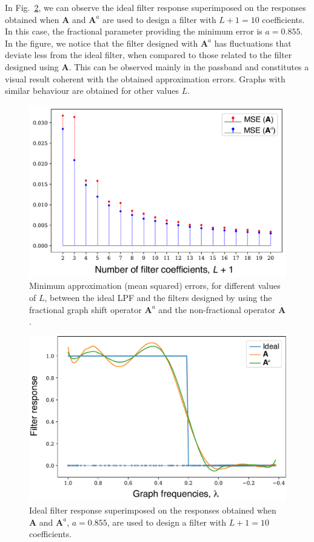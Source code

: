 In Fig.~\ref{fig:usa04}, we can observe the ideal filter response superimposed on the responses obtained when $\mathbf{A}$ and $\mathbf{A}^a$ are used to design a filter with $L+1=10$ coefficients. In this case, the fractional parameter providing the minimum error is $a=0.855$. In the figure, we notice that the filter designed with $\mathbf{A}^a$ has fluctuations that deviate less from the ideal filter, when compared to those related to the filter designed using $\mathbf{A}$. This can be observed mainly in the passband and constitutes a visual result coherent with the obtained approximation errors. Graphs with similar behaviour are obtained for other values $L$.

\begin{figure}[t!]
	\centering
\includegraphics[width=0.9\linewidth]{Figures/ERROR_mse_min.pdf}
	\caption{Minimum approximation (mean squared) errors, for different values of $L$, between the ideal LPF and the filters designed by using the fractional graph shift operator $\mathbf{A}^a$ and the non-fractional operator $\mathbf{A}$.}%
	\label{fig:usa03}%
\end{figure}

\begin{figure}[t!]
	\centering
\includegraphics[width=0.88\linewidth]{Figures/ERROR_estacoes_resposta_grau10.pdf}%
	\caption{Ideal filter response superimposed on the responses obtained when $\mathbf{A}$ and $\mathbf{A}^a$, $a=0.855$, are used to design a filter with $L+1=10$ coefficients.}
	\label{fig:usa04}%
\end{figure}

